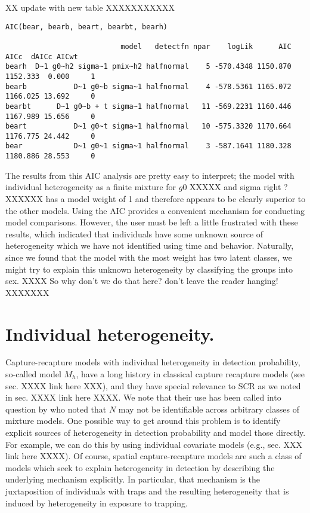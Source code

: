    XX   update with new table XXXXXXXXXXX

{\small
\begin{verbatim}
AIC(bear, bearb, beart, bearbt, bearh)

                           model   detectfn npar    logLik      AIC     AICc  dAICc AICwt
bearh  D~1 g0~h2 sigma~1 pmix~h2 halfnormal    5 -570.4348 1150.870 1152.333  0.000     1
bearb           D~1 g0~b sigma~1 halfnormal    4 -578.5361 1165.072 1166.025 13.692     0
bearbt      D~1 g0~b + t sigma~1 halfnormal   11 -569.2231 1160.446 1167.989 15.656     0
beart           D~1 g0~t sigma~1 halfnormal   10 -575.3320 1170.664 1176.775 24.442     0
bear            D~1 g0~1 sigma~1 halfnormal    3 -587.1641 1180.328 1180.886 28.553     0
\end{verbatim}
}
The results from this AIC analysis are pretty easy to interpret; the model
with individual heterogeneity as a finite mixture for $g0$ XXXXX and
sigma right ?XXXXXX
 has a
model weight of 1 and therefore appears to be clearly superior to the
other models.  Using the AIC provides a convenient mechanism for
conducting model comparisons.  However, the user must be left a little
frustrated with these results, which indicated that individuals have
some unknown source of heterogeneity which we have not identified
using time and behavior.  Naturally, since we found that the model
with the most weight has two latent classes, we might try to explain
this unknown heterogeneity by classifying the groups into sex.
XXXX So why don't we do that here? don't leave the reader hanging! XXXXXXX




\section{Individual heterogeneity.}

Capture-recapture models with individual heterogeneity in detection
probability, so-called model $M_{h}$, have a long history in classical
capture recapture models (see sec. XXXX link here XXX), and they have
special relevance to SCR as we noted in sec. XXXX link here XXXX.  We
note that their use has been called into question by \citet{link:2003}
who noted that $N$ may not be identifiable across arbitrary classes of
mixture models.  One possible way to get around this problem is to
identify explicit sources of heterogeneity in detection probability
and model those directly. For example, we can do this by using
individual covariate models (e.g., sec. XXX link here XXXX). Of
course, spatial capture-recapture models are such a class of models
which seek to explain heterogeneity in detection by describing the
underlying mechanism explicitly. In particular, that mechanism is the
juxtaposition of individuals with traps and the resulting
heterogeneity that is induced by heterogeneity in exposure to
trapping.




